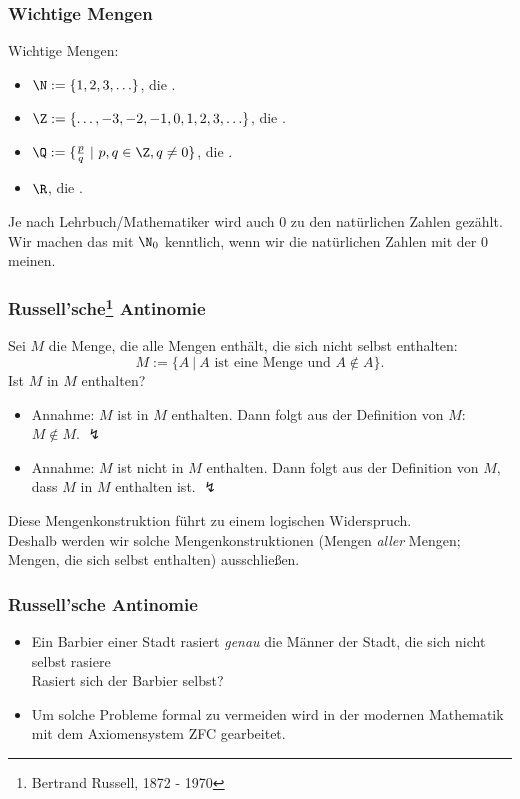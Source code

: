 %
%
\begin{frame}\frametitle{Wichtige Mengen}

	Wichtige Mengen:
	\begin{itemize}
		\item $\N := \{1,2,3,\ldots \}$, die .
		\item $\Z := \{\ldots, -3,-2,-1,0,1,2,3,\ldots\}$, die .
		\item $\Q := \{ \frac{p}{q}~ |~ p,q\in \Z, q\neq 0 \}$, die .
		\item $\R$, die .
	\end{itemize}
	\vfill
	Je nach Lehrbuch/Mathematiker wird auch $0$ zu den natürlichen Zahlen gezählt. Wir machen das mit $\N_0$ kenntlich, wenn wir die natürlichen Zahlen mit der $0$ meinen.
\end{frame}
%
%
\begin{frame}\frametitle{Russell’sche\footnote{Bertrand Russell, 1872 - 1970} Antinomie}
	
	Sei $M$ die Menge, die alle Mengen enthält, die sich nicht selbst enthalten:
	$$
		M := \{ A ~|~ A\text{~ist eine Menge und~}A\notin A \}.
	$$
	Ist $M$ in $M$ enthalten?
	\pause
	\begin{itemize}
		\item Annahme: $M$ ist in $M$ enthalten. Dann folgt aus der Definition von $M$: $M\notin M$. $\lightning$ \pause
		\item Annahme: $M$ ist nicht in $M$ enthalten. 
		Dann folgt aus der Definition von $M$, dass $M$ in $M$ enthalten ist. $\lightning$
	\end{itemize}
	\pause
	\vspace{1mm}
	Diese Mengenkonstruktion führt zu einem logischen Widerspruch.\\[1mm]
	Deshalb werden wir solche Mengenkonstruktionen (Mengen {\em aller} Mengen; Mengen, die sich selbst enthalten)  
	ausschlie{\ss}en.\\ 
	\vspace{2mm}
	 
\end{frame}
%
%
\begin{frame}\frametitle{Russell’sche Antinomie}
	\begin{itemize}
		\item Ein Barbier einer Stadt rasiert {\em genau} die Männer der Stadt, die sich nicht selbst rasiere\\[2mm]
				Rasiert sich der Barbier selbst?\\\vfill
	
		\item Um solche Probleme formal zu vermeiden wird in der modernen Mathematik mit dem Axiomensystem ZFC gearbeitet.
	\end{itemize} 
\end{frame}
%
